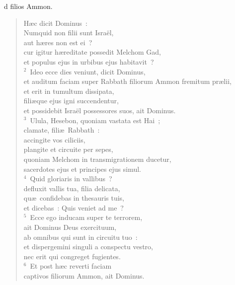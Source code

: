 \bchapter
{}d filios Ammon. \begin{flushleft}\begin{verse}\vspace{6pt}H\ae c dicit Dominus~:\\ Numquid non filii sunt Isra\"el,\\ aut h\ae res non est ei~?\\ cur igitur h\ae reditate possedit Melchom Gad,\\ et populus ejus in urbibus ejus habitavit~?\\
${}^{2}$~Ideo ecce dies veniunt, dicit Dominus,\\ et auditum faciam super Rabbath filiorum Ammon fremitum pr\ae lii,\\ et erit in tumultum dissipata,\\ fili\ae que ejus igni succendentur,\\ et possidebit Isra\"el possessores suos, ait Dominus.\\
${}^{3}$~Ulula, Hesebon, quoniam vastata est Hai~;\\ clamate, fili\ae\ Rabbath~:\\ accingite vos ciliciis,\\ plangite et circuite per sepes,\\ quoniam Melchom in transmigrationem ducetur,\\ sacerdotes ejus et principes ejus simul.\\
${}^{4}$~Quid gloriaris in vallibus~?\\ defluxit vallis tua, filia delicata,\\ qu\ae\ confidebas in thesauris tuis,\\ et dicebas~: Quis veniet ad me~?\\
${}^{5}$~Ecce ego inducam super te terrorem,\\ ait Dominus Deus exercituum,\\ ab omnibus qui sunt in circuitu tuo~:\\ et dispergemini singuli a conspectu vestro,\\ nec erit qui congreget fugientes.\\
${}^{6}$~Et post h\ae c reverti faciam\\ captivos filiorum Ammon, ait Dominus.\end{verse}\end{flushleft}


